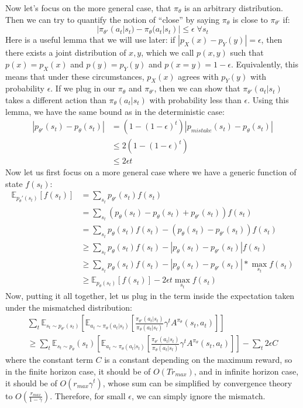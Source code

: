 Now let's focus on the more general case, that $\pi_\theta$ is an arbitrary distribution. Then we can try to quantify the notion of ``close'' by saying $\pi_\theta$ is close to $\pi_{\theta'}$ if:
$$|\pi_{\theta'}(a_t|s_t) - \pi_\theta(a_t|s_t)| \leq \epsilon \; \forall s_t$$
Here is a useful lemma that we will use later: if $|p_X(x) - p_Y(y)| = \epsilon$, then there exists a joint distribution of $x,y$, which we call $p(x,y)$ such that $p(x) = p_X(x)$ and $p(y) = p_Y(y)$ and $p(x=y) = 1-\epsilon$. Equivalently, this means that under these circumstances, $p_X(x)$ agrees with $p_Y(y)$ with probability $\epsilon$. If we plug in our $\pi_\theta$ and $\pi_{\theta'}$, then we can show that $\pi_{\theta'}(a_t|s_t)$ takes a different action than $\pi_\theta(a_t|s_t)$ with probability less than $\epsilon$. Using this lemma, we have the same bound as in the deterministic case:
\begin{align*}
  |p_{\theta'}(s_t) - p_\theta(s_t)| &= (1-(1-\epsilon)^t)|p_{mistake}(s_t) - p_\theta(s_t)|\\
  &\leq 2(1-(1-\epsilon)^t)\\
  &\leq2\epsilon t
\end{align*}
Now let us first focus on a more general case where we have a generic function of state $f(s_t)$:
\begin{align*}
    \mathbb{E}_{p_\theta'(s_t)}[f(s_t)] &= \sum_{s_t}p_{\theta'}(s_t)f(s_t)\\
    &= \sum_{s_t}(p_\theta(s_t) - p_\theta(s_t)+p_{\theta'}(s_t))f(s_t)\\
    &=\sum_{s_t}p_\theta(s_t)f(s_t) - (p_\theta(s_t)-p_{\theta'}(s_t))f(s_t)\\
    &\geq \sum_{s_t}p_\theta(s_t)f(s_t) - |p_\theta(s_t) - p_{\theta'}(s_t)|f(s_t)\\
    &\geq \sum_{s_t}p_\theta(s_t)f(s_t) - |p_\theta(s_t) - p_{\theta'}(s_t)|*\max_{s_t}f(s_t)\\
    &\geq \mathbb{E}_{p_\theta(s_t)}[f(s_t)] - 2\epsilon t\max_{s_t}f(s_t)
\end{align*}
Now, putting it all together, let us plug in the term inside the expectation taken under the mismatched distribution:
\begin{multline}
    \sum_t\mathbb{E}_{s_t\sim p_{\theta'}(s_t)}\left[\mathbb{E}_{a_t\sim \pi_\theta(a_t|s_t)}\left[\frac{\pi_{\theta'}(a_t|s_t)}{\pi_\theta(a_t|s_t)}\gamma^t A^{\pi_\theta}(s_t,a_t)\right]\right]\\
    \geq \sum_t\mathbb{E}_{s_t\sim p_{\theta}}(s_t)\left[\mathbb{E}_{a_t\sim \pi_\theta(a_t|s_t)}\left[\frac{\pi_{\theta'}(a_t|s_t)}{\pi_\theta(a_t|s_t)}\gamma^t A^{\pi_\theta}(s_t,a_t)\right]\right] - \sum_t 2\epsilon C
\end{multline}
where the constant term $C$ is a constant depending on the maximum reward, so in the finite horizon case, it should be of $O(Tr_{max})$, and in infinite horizon case, it should be of $O(r_{max}\gamma^t)$, whose sum can be simplified by convergence theory to $O(\frac{r_{max}}{1-\gamma})$. Therefore, for small $\epsilon$, we can simply ignore the mismatch. 

